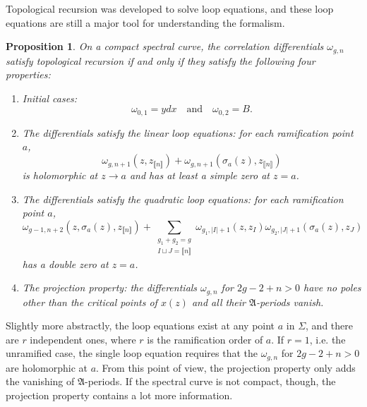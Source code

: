 \documentclass[10pt,a4paper,oneside,no-math,reqno]{amsart}%
\theoremstyle{plain}
\newtheorem{proposition}[theorem]{Proposition}
\theoremstyle{definition}
\theoremstyle{remark}
\numberwithin{equation}{section}
\newcommand{\mf}[1]{\mathfrak{#1}}
\newcommand{\1}{\mathds{1}}
\newcommand{\<}{\langle}
\renewcommand{\>}{\rangle}
\begin{document}
Topological recursion was developed to solve loop equations, and these loop equations are still a major tool for understanding the formalism. 
\begin{proposition}\label{LoopEquations}
    On a compact spectral curve, the correlation differentials $\omega_{g,n}$ satisfy topological recursion if and only if they satisfy the following four properties:
    \begin{enumerate}
        \item \emph{Initial cases}:
        \begin{equation}
            \omega_{0,1}=ydx\quad\textrm{and}\quad \omega_{0,2}=B.
        \end{equation}
        \item The differentials satisfy the \emph{linear loop equations}: for each ramification point $a$,
        \begin{equation}
            \omega_{g,n+1}(z,z_{\llbracket n \rrbracket})+\omega_{g,n+1}(\sigma_a(z),z_{\llbracket n \rrbracket})
        \end{equation}
        is holomorphic at $z\to a$ and has at least a simple zero at $z=a$.
        \item The differentials satisfy the \emph{quadratic loop equations}: for each ramification point $a$,
        \begin{equation}
            \omega_{g-1,n+2}(z,\sigma_a(z),z_{\llbracket n \rrbracket}) + \sum_{\substack{g_1+g_2=g\\I\sqcup J = \llbracket n \rrbracket}} \omega_{g_1,|I|+1}(z,z_{I})\omega_{g_2,|J|+1}(\sigma_a(z),z_{J})
        \end{equation}
        has a double zero at $ z = a$.
        \item The \emph{projection property}: the differentials $\omega_{g,n}$ for $2g-2+n>0$ have no poles other than the critical points of $x(z)$ and all their $\mathfrak{A}$-periods vanish.\label{ProjectionProperty}
    \end{enumerate}
\end{proposition}

Slightly more abstractly, the loop equations exist at any point $ a$ in $ \Sigma$, and there are $ r$ independent ones, where $r$ is the ramification order of $ a$. If $ r = 1$, i.e. the unramified case, the single loop equation requires that the $ \omega_{g,n}$ for $ 2g-2+n > 0$ are holomorphic at $ a$. From this point of view, the projection property only adds the vanishing of $ \mf{A}$-periods. If the spectral curve is not compact, though, the projection property contains a lot more information.
\end{document}
